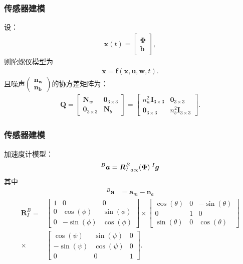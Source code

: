\documentclass{beamer}
\newcommand{\vo}[1]{\boldsymbol{#1}}
\begin{document}
	\begin{frame}
		\frametitle{传感器建模}
		设：
		\begin{align}
			\vo{x}(t) =
			\begin{bmatrix}
				\vo{\Phi}\\
				\vo{b}
			\end{bmatrix},\nonumber
		\end{align}
		则陀螺仪模型为
		\begin{align}
			\vo{\dot{x}} = \vo{f}(\vo{x},\vo{u},\vo{w},t). \label{eqn:nldyn}
		\end{align}
	    且噪声$\begin{pmatrix}\vo{n_w}\\\vo{n_b}\end{pmatrix}$的协方差矩阵为：
	    \begin{gather}
	    	\vo{Q} =
	    	\begin{bmatrix}
	    		\vo{N}_w & \vo{0}_{3\times3}\\
	    		\vo{0}_{3\times3} & \vo{N}_b
	    	\end{bmatrix}
	    	=
	    	\begin{bmatrix}
	    		n^2_w\vo{I}_{3\times3} & \vo{0}_{3\times3}\\
	    		\vo{0}_{3\times3} & n^2_b \vo{I}_{3\times3}
	    	\end{bmatrix}.\nonumber
	    \end{gather}
	\end{frame}	

	\begin{frame}
		\frametitle{传感器建模}
		
		加速度计模型：
		\begin{align}\label{Acc_model}
			{}^B \vo{a} = {\vo{R}^{B}_I}_{acc} (\vo{\Phi}) \hspace{0.1cm} {}^I\vo{g}
		\end{align}
		其中
		\begin{align}
			{}^B{\vo{a}} &= \vo{a}_m - \vo{n}_a \nonumber
		\end{align}
		\begin{align}
			\vo{R}^B_I =&
			\begin{bmatrix}\nonumber
				1 &0 &0\\ 0 &\cos(\phi)& \sin(\phi)\\ 0& -\sin(\phi)& \cos(\phi)
			\end{bmatrix} \times
			\begin{bmatrix}
				\cos(\theta)& 0& -\sin(\theta)\\ 0& 1& 0\\ \sin(\theta)& 0& \cos(\theta)
			\end{bmatrix}\\ \times
			&
			\begin{bmatrix}
				\cos(\psi)& \sin(\psi)& 0\\ -\sin(\psi)& \cos(\psi)& 0\\ 0& 0& 1
			\end{bmatrix}.\nonumber
		\end{align}
	\end{frame}
\end{document}
